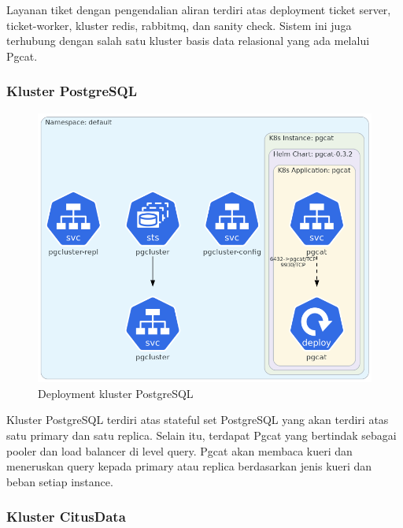 Layanan tiket dengan pengendalian aliran terdiri atas deployment ticket server, ticket-worker, kluster redis, rabbitmq, dan sanity check. Sistem ini juga terhubung dengan salah satu kluster basis data relasional yang ada melalui Pgcat.

\pagebreak

\subsubsection{Kluster PostgreSQL}

\begin{figure}[htbp]
    \centering
    \includegraphics[width=1\textwidth]{resources/chapter-4/postgres.png}
    \caption{Deployment kluster PostgreSQL}
    \label{fig:deployment-postgres}
\end{figure}

Kluster PostgreSQL terdiri atas stateful set PostgreSQL yang akan terdiri atas satu primary dan satu replica. Selain itu, terdapat Pgcat yang bertindak sebagai pooler dan load balancer di level query. Pgcat akan membaca kueri dan meneruskan query kepada primary atau replica berdasarkan jenis kueri dan beban setiap instance.

\pagebreak

\subsubsection{Kluster CitusData}

